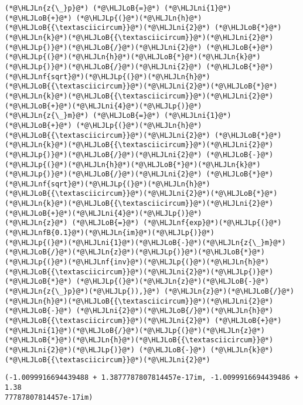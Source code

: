 \documentclass[12pt,a4paper]{article}
\newcommand{\HLJLn}[1]{#1}
\newcommand{\HLJLnf}[1]{\textcolor[RGB]{66,102,213}{#1}}
\newcommand{\HLJLnfB}[1]{\textcolor[RGB]{59,151,46}{#1}}
\newcommand{\HLJLni}[1]{\textcolor[RGB]{59,151,46}{#1}}
\newcommand{\HLJLoB}[1]{\textcolor[RGB]{102,102,102}{\textbf{#1}}}
\newcommand{\HLJLp}[1]{#1}
\begin{document}
\begin{lstlisting}
(*@\HLJLn{z{\_}p}@*) (*@\HLJLoB{=}@*) (*@\HLJLni{1}@*) (*@\HLJLoB{+}@*) (*@\HLJLp{(}@*)(*@\HLJLn{h}@*)(*@\HLJLoB{{\textasciicircum}}@*)(*@\HLJLni{2}@*) (*@\HLJLoB{*}@*) (*@\HLJLn{k}@*)(*@\HLJLoB{{\textasciicircum}}@*)(*@\HLJLni{2}@*)(*@\HLJLp{)}@*)(*@\HLJLoB{/}@*)(*@\HLJLni{2}@*) (*@\HLJLoB{+}@*) (*@\HLJLp{(}@*)(*@\HLJLn{h}@*)(*@\HLJLoB{*}@*)(*@\HLJLn{k}@*)(*@\HLJLp{)}@*)(*@\HLJLoB{/}@*)(*@\HLJLni{2}@*) (*@\HLJLoB{*}@*) (*@\HLJLnf{sqrt}@*)(*@\HLJLp{(}@*)(*@\HLJLn{h}@*)(*@\HLJLoB{{\textasciicircum}}@*)(*@\HLJLni{2}@*)(*@\HLJLoB{*}@*)(*@\HLJLn{k}@*)(*@\HLJLoB{{\textasciicircum}}@*)(*@\HLJLni{2}@*)(*@\HLJLoB{+}@*)(*@\HLJLni{4}@*)(*@\HLJLp{)}@*)
(*@\HLJLn{z{\_}m}@*) (*@\HLJLoB{=}@*) (*@\HLJLni{1}@*) (*@\HLJLoB{+}@*) (*@\HLJLp{(}@*)(*@\HLJLn{h}@*)(*@\HLJLoB{{\textasciicircum}}@*)(*@\HLJLni{2}@*) (*@\HLJLoB{*}@*) (*@\HLJLn{k}@*)(*@\HLJLoB{{\textasciicircum}}@*)(*@\HLJLni{2}@*)(*@\HLJLp{)}@*)(*@\HLJLoB{/}@*)(*@\HLJLni{2}@*) (*@\HLJLoB{-}@*) (*@\HLJLp{(}@*)(*@\HLJLn{h}@*)(*@\HLJLoB{*}@*)(*@\HLJLn{k}@*)(*@\HLJLp{)}@*)(*@\HLJLoB{/}@*)(*@\HLJLni{2}@*) (*@\HLJLoB{*}@*) (*@\HLJLnf{sqrt}@*)(*@\HLJLp{(}@*)(*@\HLJLn{h}@*)(*@\HLJLoB{{\textasciicircum}}@*)(*@\HLJLni{2}@*)(*@\HLJLoB{*}@*)(*@\HLJLn{k}@*)(*@\HLJLoB{{\textasciicircum}}@*)(*@\HLJLni{2}@*)(*@\HLJLoB{+}@*)(*@\HLJLni{4}@*)(*@\HLJLp{)}@*)
(*@\HLJLn{z}@*) (*@\HLJLoB{=}@*) (*@\HLJLnf{exp}@*)(*@\HLJLp{(}@*)(*@\HLJLnfB{0.1}@*)(*@\HLJLn{im}@*)(*@\HLJLp{)}@*)
(*@\HLJLp{(}@*)(*@\HLJLni{1}@*)(*@\HLJLoB{-}@*)(*@\HLJLn{z{\_}m}@*)(*@\HLJLoB{/}@*)(*@\HLJLn{z}@*)(*@\HLJLp{)}@*)(*@\HLJLoB{*}@*)(*@\HLJLp{(}@*)(*@\HLJLnf{inv}@*)(*@\HLJLp{(}@*)(*@\HLJLn{h}@*)(*@\HLJLoB{{\textasciicircum}}@*)(*@\HLJLni{2}@*)(*@\HLJLp{)}@*) (*@\HLJLoB{*}@*) (*@\HLJLp{(}@*)(*@\HLJLn{z}@*)(*@\HLJLoB{-}@*)(*@\HLJLn{z{\_}p}@*)(*@\HLJLp{)),}@*) (*@\HLJLn{z}@*)(*@\HLJLoB{/}@*)(*@\HLJLn{h}@*)(*@\HLJLoB{{\textasciicircum}}@*)(*@\HLJLni{2}@*) (*@\HLJLoB{-}@*) (*@\HLJLni{2}@*)(*@\HLJLoB{/}@*)(*@\HLJLn{h}@*)(*@\HLJLoB{{\textasciicircum}}@*)(*@\HLJLni{2}@*) (*@\HLJLoB{+}@*) (*@\HLJLni{1}@*)(*@\HLJLoB{/}@*)(*@\HLJLp{(}@*)(*@\HLJLn{z}@*)(*@\HLJLoB{*}@*)(*@\HLJLn{h}@*)(*@\HLJLoB{{\textasciicircum}}@*)(*@\HLJLni{2}@*)(*@\HLJLp{)}@*) (*@\HLJLoB{-}@*) (*@\HLJLn{k}@*)(*@\HLJLoB{{\textasciicircum}}@*)(*@\HLJLni{2}@*)
\end{lstlisting}

\begin{lstlisting}
(-1.0099916694439488 + 1.3877787807814457e-17im, -1.0099916694439486 + 1.38
77787807814457e-17im)
\end{lstlisting}
\end{document}
